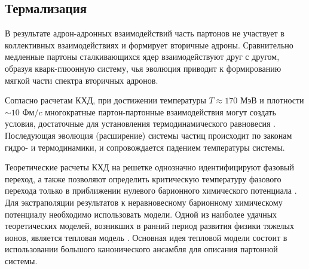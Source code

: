 


\subsection{Термализация}

В результате адрон-адронных взаимодействий часть партонов не участвует в коллективных взаимодействиях и формирует вторичные адроны. Сравнительно медленные партоны сталкивающихся ядер взаимодействуют друг с другом, образуя кварк-глюонную систему, чья эволюция приводит к формированию мягкой части спектра вторичных адронов.

Согласно расчетам КХД, при достижении температуры $T\approx170$ МэВ и плотности $\sim10$ Фм/$c$ многократные партон-партонные взаимодействия могут создать условия, достаточные для установления термодинамического равновесия \cite{QGP}. Последующая эволюция (расширение) системы частиц происходит по законам гидро- и термодинамики, и сопровождается падением температуры системы. 

Теоретические расчеты КХД на решетке однозначно идентифицируют фазовый переход, а также позволяют определить критическую температуру фазового перехода только в приближении нулевого барионного химического потенциала \cite{LatticeQCD_PhaseTransition1, LatticeQCD_PhaseTransition2}. 
Для экстраполяции результатов к неравновесному барионному химическому потенциалу необходимо использовать модели. Одной из наиболее удачных теоретических моделей, возникших в ранний период развития физики тяжелых ионов, является тепловая модель \cite{ThermalModel}. Основная идея тепловой модели состоит в использовании большого канонического ансамбля для описания партонной системы. 

